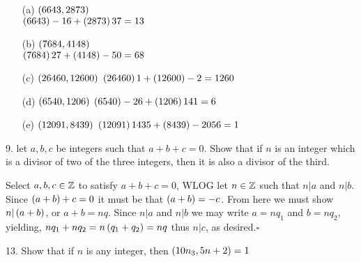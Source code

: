 \begin{mdframed}[style=darkAnswer,frametitle={Joe Starr}]
  \begin{itemize}
    \item [(a)] {$\left(6643,2873\right)$\\
          $\left(6643\right)-16+\left(2873\right)37=13$
          }
    \item [(b)] {$\left(7684,4148\right)$\\
          $\left(7684\right)27+\left(4148\right)-50=68$
          }
    \item [(c)] {$\left(26460,12600\right)$
          $\left(26460\right)1+\left(12600\right)-2=1260$
          }
    \item [(d)] {$\left(6540,1206\right)$
          $\left(6540\right)-26+\left(1206\right)141=6$
          }
    \item [(e)] {$\left(12091,8439\right)$
          $\left(12091\right)1435+\left(8439\right)-2056=1$
          }
  \end{itemize}
\end{mdframed}
\newpage
\begin{mdframed}[style=darkQuesion]
  9.  let $a,b,c$ be integers such that $a+b+c=0$. Show that if $n$ is an integer
  which is a divisor of two of the three integers, then it is also a divisor of
  the third.

\end{mdframed}

\begin{mdframed}[style=darkAnswer,frametitle={Joe Starr}]
  Select $a,b,c\in \mathbb{Z}$ to satisfy $a+b+c=0$, WLOG let $n\in \mathbb{Z}$ such that
  $n\vert a$ and $n\vert b$. Since $\left(a+b\right)+c=0$ it must be that $\left(a+b\right)=-c$.
  From here we must show $n\vert\left(a+b\right)$, or $a+b=nq$. Since $n\vert a$ and
  $n\vert b$ we may write $a=nq_1$ and $b=nq_2$, yielding,
  $nq_1+nq_2=n\left(q_1+q_2\right)=nq$ thus $n\vert c$, as desired.$\square$
\end{mdframed}
\newpage
\begin{mdframed}[style=darkQuesion]
  13.  Show that if $n$ is any integer, then $\left(10n_3,5n+2\right)=1$
\end{mdframed}


